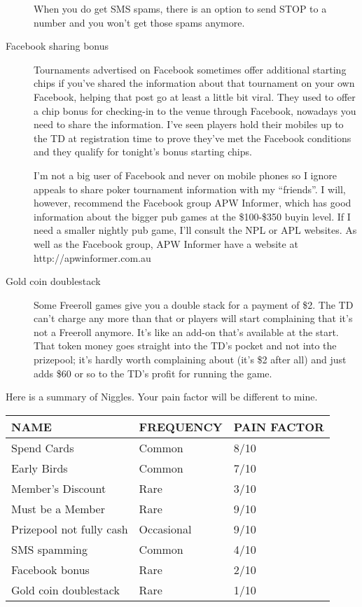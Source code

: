 \begin{description}
When you do get SMS spams, there is an option to send STOP to a number
and you won't get those spams anymore.

\item[Facebook sharing bonus] Tournaments advertised on Facebook sometimes
offer additional starting chips if you've shared the information
about that tournament on your own Facebook, helping that post go at
least a little bit viral. They used to offer a chip bonus for
checking-in to the venue through Facebook, nowadays you need to share
the information. I've seen players hold their mobiles up to the TD at
registration time to prove they've met the Facebook conditions and
they qualify for tonight's bonus starting chips.

I'm not a big user of Facebook and never on mobile phones so I ignore
appeals to share poker tournament information with my ``friends''. I
will, however, recommend the Facebook group APW Informer, which has
good information about the bigger pub games at the \$100-\$350 buyin
level. If I need a smaller nightly pub game, I'll consult the NPL or
APL websites. As well as the Facebook group, APW Informer have a
website at http://apwinformer.com.au

\item[Gold coin doublestack] Some Freeroll games give you a double stack
for a payment of \$2. The TD can't charge any more than that or
players will start complaining that it's not a Freeroll anymore.
It's like an add-on that's available at the start. That token
money goes straight into the TD's pocket and not into the prizepool;
it's hardly worth complaining about (it's \$2 after all) and just adds
\$60 or so to the TD's profit for running the game.

\end{description}

Here is a summary of Niggles. Your pain factor will be different to
mine.

\begin{tabular}{|l|l|l|} \hline
NAME    &  FREQUENCY  & PAIN FACTOR\\ \hline
Spend Cards & Common  & 8/10\\ \hline
Early Birds & Common & 7/10\\ \hline
Member's Discount & Rare  & 3/10\\ \hline
Must be a Member & Rare  & 9/10\\ \hline
Prizepool not fully cash & Occasional & 9/10\\ \hline
SMS spamming & Common & 4/10\\ \hline
Facebook bonus & Rare & 2/10 \\ \hline
Gold coin doublestack & Rare & 1/10 \\ \hline
\end{tabular}

